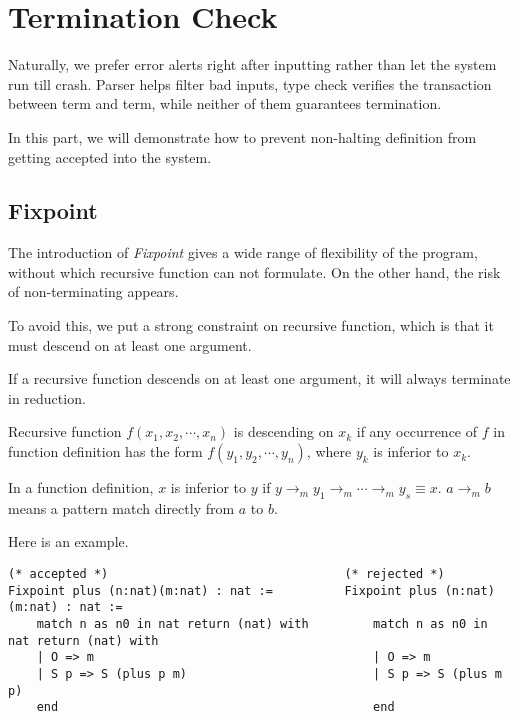 \section{Termination Check}

Naturally, we prefer error alerts right after inputting rather than let the system run till crash. 
Parser helps filter bad inputs, type check verifies the transaction between term and term, while 
neither of them guarantees termination.\par
In this part, we will demonstrate how to prevent non-halting definition from getting accepted into
the system.

\subsection{Fixpoint}

The introduction of {\it Fixpoint} gives a wide range of flexibility of the program, without which recursive
function can not formulate. On the other hand, the risk of non-terminating appears.\par
To avoid this, we put a strong constraint on recursive function, which is that it must descend on at least one
argument. 
\begin{Prop}
If a recursive function descends on at least one argument, it will always terminate in reduction.
\end{Prop}
\begin{Def}[Descending]
Recursive function $f(x_1,x_2,\cdots,x_n)$ is descending on $x_k$ if any occurrence of $f$ in function definition has the 
form $f(y_1,y_2,\cdots,y_n)$, where $y_k$ is inferior to $x_k$.
\end{Def}
\begin{Def}[Inferior]
In a function definition, $x$ is inferior to $y$ if $y\to_m y_1\to_m \cdots\to_m y_s\equiv x$.
$a \to_m b$ means a pattern match directly from $a$ to $b$.
\end{Def}
Here is an example.
\begin{center}
\begin{verbatim}
(* accepted *)                                 (* rejected *)
Fixpoint plus (n:nat)(m:nat) : nat :=          Fixpoint plus (n:nat)(m:nat) : nat :=
    match n as n0 in nat return (nat) with         match n as n0 in nat return (nat) with    
    | O => m                                       | O => m
    | S p => S (plus p m)                          | S p => S (plus m p)
    end                                            end
\end{verbatim}
\end{center}

